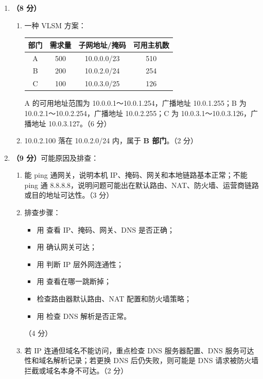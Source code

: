 \documentclass[a4paper,11pt]{article}
\begin{document}
\begin{enumerate}[start=13, label=\textbf{\arabic*.}, leftmargin=2.4em, itemsep=0.45em]
\item \textbf{（8 分）}
\begin{enumerate}[label=（\arabic*）, leftmargin=2.2em, itemsep=1pt]
  \item 一种 VLSM 方案：
  \begin{center}\small
  \begin{tabular}{cccc}
  \toprule
  部门 & 需求量 & 子网地址/掩码 & 可用主机数 \\
  \midrule
  A & 500 & 10.0.0.0/23 & 510 \\
  B & 200 & 10.0.2.0/24 & 254 \\
  C & 100 & 10.0.3.0/25 & 126 \\
  \bottomrule
  \end{tabular}
  \end{center}
  A 的可用地址范围为 10.0.0.1～10.0.1.254，广播地址 10.0.1.255；B 为 10.0.2.1～10.0.2.254，广播地址 10.0.2.255；C 为 10.0.3.1～10.0.3.126，广播地址 10.0.3.127。\hfill（6 分）
  \item 10.0.2.100 落在 10.0.2.0/24 内，属于 \textbf{B 部门}。\hfill（2 分）
\end{enumerate}

\item \textbf{（9 分）}可能原因及排查：
\begin{enumerate}[label=（\arabic*）, leftmargin=2.2em, itemsep=1pt]
  \item 能 ping 通网关，说明本机 IP、掩码、网关和本地链路基本正常；不能 ping 通 8.8.8.8，说明问题可能出在默认路由、NAT、防火墙、运营商链路或目的地址可达性。\hfill（3 分）
  \item 排查步骤：
  \begin{itemize}[leftmargin=1.8em, itemsep=1pt]
    \item 用  查看 IP、掩码、网关、DNS 是否正确；
    \item 用  确认网关可达；
    \item 用  判断 IP 层外网连通性；
    \item 用  查看在哪一跳断掉；
    \item 检查路由器默认路由、NAT 配置和防火墙策略；
    \item 用  检查 DNS 解析是否正常。
  \end{itemize}
  \hfill（4 分）
  \item 若 IP 连通但域名不能访问，重点检查 DNS 服务器配置、DNS 服务可达性和域名解析记录；若更换 DNS 后仍失败，则可能是 DNS 请求被防火墙拦截或域名本身不可达。\hfill（2 分）
\end{enumerate}

\end{enumerate}
\end{document}
